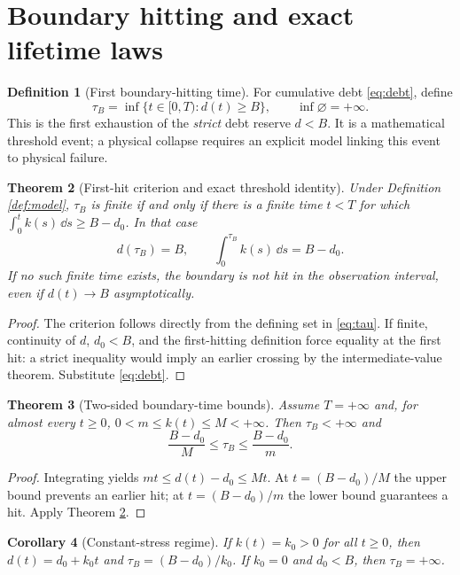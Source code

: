 \documentclass[11pt,letterpaper]{article}
\newtheorem{theorem}{Theorem}[section]
\newtheorem{corollary}[theorem]{Corollary}
\theoremstyle{definition}\newtheorem{definition}[theorem]{Definition}\newtheorem{example}[theorem]{Example}
\theoremstyle{remark}\newtheorem{remark}[theorem]{Remark}
\begin{document}
\section{Boundary hitting and exact lifetime laws}
\begin{definition}[First boundary-hitting time]
For cumulative debt \eqref{eq:debt}, define
\begin{equation}\label{eq:tau}
\tau_B=\inf\{t\in[0,T):d(t)\geq B\},\qquad\inf\varnothing=+\infty.
\end{equation}
This is the first exhaustion of the \emph{strict} debt reserve $d<B$. It is a mathematical threshold event; a physical collapse requires an explicit model linking this event to physical failure.
\end{definition}
\begin{theorem}[First-hit criterion and exact threshold identity]\label{th:hit}
Under Definition \ref{def:model}, $\tau_B$ is finite if and only if there is a finite time $t<T$ for which $\int_0^t k(s)\,\dd s\geq B-d_0$. In that case
\begin{equation}\label{eq:hit}
 d(\tau_B)=B,\qquad \int_0^{\tau_B}k(s)\,\dd s=B-d_0.
\end{equation}
If no such finite time exists, the boundary is not hit in the observation interval, even if $d(t)\to B$ asymptotically.
\end{theorem}
\begin{proof}
The criterion follows directly from the defining set in \eqref{eq:tau}. If finite, continuity of $d$, $d_0<B$, and the first-hitting definition force equality at the first hit: a strict inequality would imply an earlier crossing by the intermediate-value theorem. Substitute \eqref{eq:debt}.
\end{proof}
\begin{theorem}[Two-sided boundary-time bounds]\label{th:bounds}
Assume $T=+\infty$ and, for almost every $t\geq0$, $0<m\leq k(t)\leq M<+\infty$. Then $\tau_B<+\infty$ and
\begin{equation}\label{eq:bounds}
\boxed{\frac{B-d_0}{M}\leq \tau_B\leq\frac{B-d_0}{m}}.
\end{equation}
\end{theorem}
\begin{proof}
Integrating yields $mt\leq d(t)-d_0\leq Mt$. At $t=(B-d_0)/M$ the upper bound prevents an earlier hit; at $t=(B-d_0)/m$ the lower bound guarantees a hit. Apply Theorem \ref{th:hit}.
\end{proof}
\begin{corollary}[Constant-stress regime]\label{cor:constant}
If $k(t)=k_0>0$ for all $t\geq0$, then $d(t)=d_0+k_0t$ and
$\tau_B=(B-d_0)/k_0$. If $k_0=0$ and $d_0<B$, then $\tau_B=+\infty$.
\end{corollary}
\end{document}
